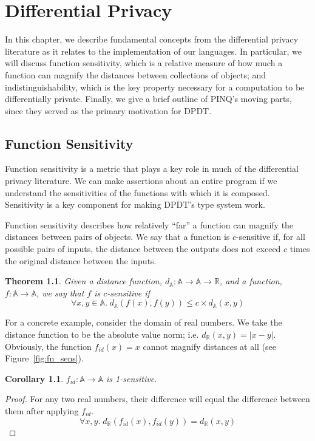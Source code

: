 \documentclass[12pt]{report}
\newtheorem{thm}[defn]{Theorem}
\newtheorem{cor}[defn]{Corollary}
\begin{document}
\chapter{Differential Privacy}\label{sec:differential_privacy}

In this chapter, we describe fundamental concepts from the differential privacy literature as it relates to the implementation of our languages.
In particular, we will discuss function sensitivity, which is a relative measure of how much a function can magnify the distances between collections of objects; and indistinguishability, which is the key property necessary for a computation to be differentially private.
Finally, we give a brief outline of PINQ's moving parts, since they served as the primary motivation for DPDT.

\section{Function Sensitivity}\label{subsec:fn_sens}

Function sensitivity is a metric that plays a key role in much of the differential privacy literature.
We can make assertions about an entire program if we understand the sensitivities of the functions with which it is composed.
Sensitivity is a key component for making DPDT's type system work.

Function sensitivity describes how relatively ``far'' a function can magnify the distances between pairs of objects.
We say that a function is $c$-sensitive if, for all possible pairs of inputs, the distance between the outputs does not exceed $c$ times the original distance between the inputs.

\begin{thm}\label{thm:csens}
  Given a distance function, $d_{\mathbb A} : \mathbb A \rightarrow \mathbb A \rightarrow \mathbb R$, and a function, $f : \mathbb A \rightarrow \mathbb A$, we say that $f$ is $c$-sensitive if
  $$\forall x,y\in\mathbb A.\; d_{\mathbb A}(f(x),f(y)) \le c \times d_{\mathbb A}(x,y)$$
\end{thm}

\begin{samepage}
For a concrete example, consider the domain of real numbers.
We take the distance function to be the absolute value norm; i.e. $d_\mathbb{R}(x,y) = |x - y|$.
Obviously, the function $f_{id}(x)=x$ cannot magnify distances at all (see Figure~\ref{fig:fn_sens}).
\begin{cor}
$f_{id} : \mathbb A \rightarrow \mathbb A$ is 1-sensitive.
\end{cor}
\begin{proof}
For any two real numbers, their difference will equal the difference between them after applying $f_{id}$.
\nopagebreak
\[
  \forall x,y.\; d_\mathbb{R}(f_{id}(x),f_{id}(y)) = d_\mathbb{R}(x,y)
\]
\end{proof}
\end{samepage}
\end{document}
